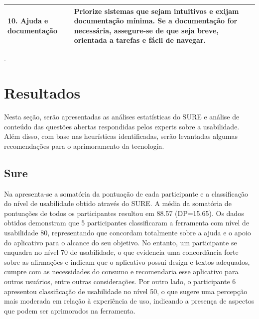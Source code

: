 \documentclass[portuguese]{textolivre}
\begin{document}
\begin{table}[h!]
\begin{threeparttable}
\begin{tabular}{p{3.5cm}p{10cm}}
10. Ajuda e documentação &
Priorize sistemas que sejam intuitivos e exijam documentação mínima. Se a documentação for necessária, assegure-se de que seja breve, orientada a tarefas e fácil de navegar. \\

\bottomrule
\end{tabular}

\vspace{0.3cm}
.
\end{threeparttable}
\end{table}



\section{Resultados}\label{sec-organizacao}
Nesta seção, serão apresentadas as análises estatísticas do SURE e análise de conteúdo das questões abertas respondidas pelos experts sobre a usabilidade. Além disso, com base nas heurísticas identificadas, serão levantadas algumas recomendações para o aprimoramento da tecnologia.

\subsection{Sure}\label{sec-organizacao-latex}
Na  apresenta-se a somatória da pontuação de cada participante e a classificação do nível de usabilidade obtido através do SURE. A média da somatória de pontuações de todos os participantes resultou em 88.57 (DP=15.65). Os dados obtidos demonstram que 5 participantes classificaram a ferramenta com nível de usabilidade 80, representando que concordam totalmente sobre a ajuda e o apoio do aplicativo para o alcance do seu objetivo. No entanto, um participante se enquadra no nível 70 de usabilidade, o que evidencia uma concordância forte sobre as afirmações e indicam que o aplicativo possui design e textos adequados, cumpre com as necessidades do consumo e recomendaria esse aplicativo para outros usuários, entre outras considerações. Por outro lado, o participante 6 apresentou classificação de usabilidade no nível 50, o que sugere uma percepção mais moderada em relação à experiência de uso, indicando a presença de aspectos que podem ser aprimorados na ferramenta.
\end{document}
